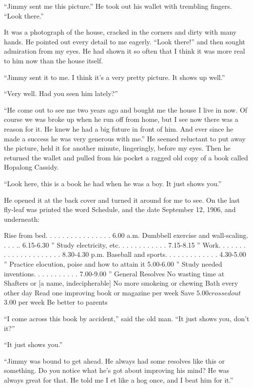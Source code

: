 \documentclass{znotebook}
\begin{document}
``Jimmy sent me this picture.'' He took out his wallet with trembling fingers. ``Look there.''

It was a photograph of the house, cracked in the corners and dirty with many hands. He pointed out every detail to me eagerly. ``Look there!'' and then sought admiration from my eyes. He had shown it so often that I think it was more real to him now than the house itself.

``Jimmy sent it to me. I think it's a very pretty picture. It shows up well.''

``Very well. Had you seen him lately?''

``He come out to see me two years ago and bought me the house I live in now. Of course we was broke up when he run off from home, but I see now there was a reason for it. He knew he had a big future in front of him. And ever since he made a success he was very generous with me.'' He seemed reluctant to put away the picture, held it for another minute, lingeringly, before my eyes. Then he returned the wallet and pulled from his pocket a ragged old copy of a book called Hopalong Cassidy.

``Look here, this is a book he had when he was a boy. It just shows you.''

He opened it at the back cover and turned it around for me to see. On the last fly-leaf was printed the word Schedule, and the date September 12, 1906, and underneath:

Rise from bed. . . . . . . . . . . . . . . .	6.00 a.m.
Dumbbell exercise and wall-scaling. . . . ..	6.15-6.30 ''
Study electricity, etc. . . . . . . . . . . .	7.15-8.15 ''
Work. . . . . . . . . . . . . . . . . . . . .	8.30-4.30 p.m.
Baseball and sports. . . . . . . . . . . . .	4.30-5.00 ''
Practice elocution, poise and how to attain it	5.00-6.00 ''
Study needed inventions. . . . . . . . . . .	7.00-9.00 ''
General Resolves No wasting time at Shafters or [a name, indecipherable] No more smokeing or chewing Bath every other day Read one improving book or magazine per week Save $5.00 {crossed out} $3.00 per week Be better to parents

``I come across this book by accident,'' said the old man. ``It just shows you, don't it?''

``It just shows you.''

``Jimmy was bound to get ahead. He always had some resolves like this or something. Do you notice what he's got about improving his mind? He was always great for that. He told me I et like a hog once, and I beat him for it.''
\end{document}
